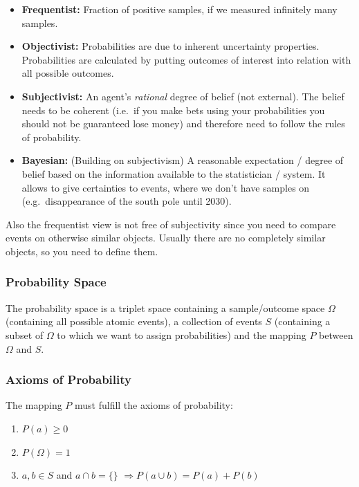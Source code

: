 \documentclass[
]{book}
\begin{document}
\begin{itemize}
\item
  \textbf{Frequentist:} Fraction of positive samples, if we measured
  infinitely many samples.
\item
  \textbf{Objectivist:} Probabilities are due to inherent uncertainty
  properties. Probabilities are calculated by putting outcomes of
  interest into relation with all possible outcomes.
\item
  \textbf{Subjectivist:} An agent's \emph{rational} degree of belief (not
  external). The belief needs to be coherent (i.e.~if you make bets
  using your probabilities you should not be guaranteed lose money)
  and therefore need to follow the rules of probability.
\item
  \textbf{Bayesian:} (Building on subjectivism) A reasonable expectation /
  degree of belief based on the information available to the
  statistician / system. It allows to give certainties to events,
  where we don't have samples on (e.g.~disappearance of the south pole
  until 2030).
\end{itemize}

Also the frequentist view is not free of subjectivity since you need to
compare events on otherwise similar objects. Usually there are no
completely similar objects, so you need to define them.

\hypertarget{probability-space}{%
\subsubsection{Probability Space}\label{probability-space}}

The probability space is a triplet space containing a sample/outcome
space \(\Omega\) (containing all possible atomic events), a collection of
events \(S\) (containing a subset of \(\Omega\) to which we want to assign
probabilities) and the mapping \(P\) between \(\Omega\) and \(S\).

\hypertarget{axioms-of-probability}{%
\subsubsection{Axioms of Probability}\label{axioms-of-probability}}

The mapping \(P\) must fulfill the axioms of probability:

\begin{enumerate}
\def\labelenumi{\arabic{enumi}.}
\item
  \(P(a) \geq 0\)
\item
  \(P(\Omega) = 1\)
\item
  \(a,b \in S\) and \(a \cap b = \{\}\)
  \(\Rightarrow P(a \cup b) = P(a) + P(b)\)
\end{enumerate}
\end{document}
